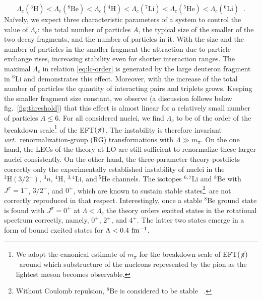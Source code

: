 \documentclass[onecolumn,preprint,superscriptaddress,nofootinbib]{revtex4-1}
\newcommand{\lc}{\ensuremath{\Lambda_c}}
\newcommand{\wrt}{\textit{wrt.}~}
\newcommand{\eftnopi}{\mbox{EFT$(\not \! \pi)$}}
\newcommand{\figref}[1]{fig.~\ref{#1}}
\begin{document}
\begin{equation}
\label{eq:lc-order}
\lc(^3\text{H})<\lc(^8\text{Be})<\lc(^4\text{H})<\lc(^7\text{Li})<\lc(^5\text{He})<\lc(^6\text{Li})\;\;.
\end{equation}
%
Na\"ively, we expect three characteristic parameters of a system to control the value of $\lc$:
the total number of particles $A$, the typical size of the smaller of the two decay fragments, and
the number of particles in it.
With the size and the number of particles in the smaller fragment the attraction due to particle
exchange rises, increasing stability even for shorter interaction ranges.
The maximal $\lc$ in relation \eqref{eq:lc-order} is generated by the large
deuteron fragment in ${}^6$Li and demonstrates this effect.
Moreover, with the increase of the total number of particles the quantity of interacting pairs and triplets grows.
Keeping the smaller fragment size constant, we observe
(a discussion follows below \figref{fig:threshold})
that this effect is almost linear for a relatively small number of particles $A \leq 6$.
%
For all considered nuclei, we find $\lc$ to be of the order of the breakdown scale\footnote{We
adopt the canonical estimate of $m_\pi$ for the breakdown scale of \eftnopi~around which
substructure of the nucleons represented by the pion as the lightest meson becomes observable.}
of the \eftnopi.
%
The instability is therefore invariant \wrt renormalization-group (RG)
transformations with $\Lambda\gg m_\pi$.
On the one hand, the LECs of the theory at LO are still sufficient to renormalize these larger
nuclei consistently.
On the other hand, the three-parameter theory postdicts correctly only the experimentally
established instability of nuclei in the
$^3\text{H}(3/2^-),\,^3n,\,^4\text{H},\,^{3,4}\text{Li},\,\text{and}~^5\text{He}$ channels.
The isotopes $^{6,7}\text{Li}$ and $^8$Be with $J^\pi=1^+$, $3/2^-$, and $0^+$, which are known to sustain stable
states\footnote{Without Coulomb repulsion, $^8$Be is considered to be stable ~\cite{AFZAL:1969zz,Higa:2008dn}.}~are
not correctly reproduced in that respect.
%
Interestingly, once a stable $^8$Be ground state is found with $J^\pi=0^+$ at $\Lambda<\lc$ the theory orders excited states in the
rotational spectrum correctly, namely, $0^+$, $2^+$, and $4^+$. 
The latter two states emerge in a form of bound excited states for $\Lambda<0.4~{\rm fm^{-1}}$.
\end{document}
